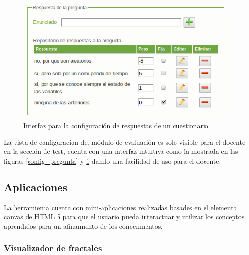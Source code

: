 \documentclass[letterpaper, 11pt, oneside]{article}
\theoremstyle{definition}
\theoremstyle{remark}
\begin{document}
\begin{figure}[h] 
\begin{center}
\includegraphics[width=12cm,clip]{Imagenes/config_respuesta.png}
\end{center}
\caption{Interfaz para la configuración de respuestas de un cuestionario}
\label{config_respuesta}
\end{figure}


La vista de configuración del módulo de evaluación es solo visible para el docente en la sección de test, cuenta con una interfaz intuitiva como la mostrada en las figuras \ref{config_pregunta} y \ref{config_respuesta} dando una facilidad de uso para el docente.

\clearpage
\newpage

\subsection{Aplicaciones}

La herramienta cuenta con mini-aplicaciones realizadas basades en el elemento canvas de HTML 5 para que el usuario pueda interactuar y utilizar los conceptos aprendidos para un afinamiento de los conocimientos.

\subsubsection{Visualizador de fractales} 
 
\end{document}
